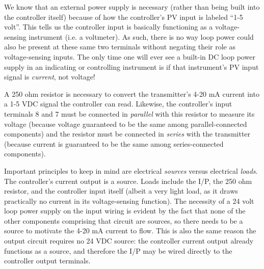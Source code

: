 We know that an external power supply is necessary (rather than being built into the controller itself) because of how the controller's PV input is labeled ``1-5 volt''.  This tells us the controller input is basically functioning as a voltage-sensing instrument (i.e. a voltmeter).  As such, there is no way loop power could also be present at these same two terminals without negating their role as voltage-sensing inputs.  The only time one will ever see a built-in DC loop power supply in an indicating or controlling instrument is if that instrument's PV input signal is {\it current}, not voltage!

\vskip 10pt

A 250 ohm resistor is necessary to convert the transmitter's 4-20 mA current into a 1-5 VDC signal the controller can read.  Likewise, the controller's input terminals 8 and 7 must be connected in {\it parallel} with this resistor to measure its voltage (because voltage guaranteed to be the same among parallel-connected components) and the resistor must be connected in {\it series} with the transmitter (because current is guaranteed to be the same among series-connected components).

Important principles to keep in mind are electrical {\it sources} versus electrical {\it loads}.  The controller's current output is a source.  Loads include the I/P, the 250 ohm resistor, and the controller input itself (albeit a very light load, as it draws practically no current in its voltage-sensing function).  The necessity of a 24 volt loop power supply on the input wiring is evident by the fact that none of the other components comprising that circuit are sources, so there needs to be a source to motivate the 4-20 mA current to flow.  This is also the same reason the output circuit requires no 24 VDC source: the controller current output already functions as a source, and therefore the I/P may be wired directly to the controller output terminals.




